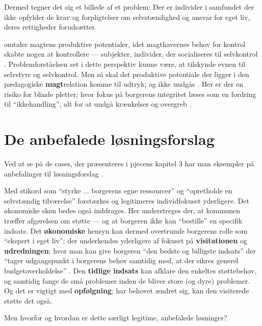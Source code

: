 Dermed tegner det sig et billede af et problem: Der er individer i samfundet der ikke opfylder de krav og forpligtelser om selvstændighed og ansvar for eget liv, deres rettigheder forudsætter.

\citeauthor{foucaultOvervagningOgStraf2005} omtaler magtens produktive potentialer, idet magthavernes behov for kontrol skabte nogen at kontrollere --- subjekter, individer, der socialiseres til selvkontrol \autocite{foucaultOvervagningOgStraf2005}.
Problemforståelsen set i dette perspektiv kunne være, at tilskynde evnen til selvstyre og selvkontrol.
Men så skal det produktive potentiale der ligger i den pædagogiske \textbf{magt}relation komme til udtryk; og ikke undgås \autocite{hurFrigorelsensMagt2015}.
Her er der en risiko for blinde pletter; hvor fokus på borgerens integritet læses som en fordring til “ikkehandling”, alt for at undgå krænkelser og overgreb \autocite{langagerDetAfmalteLiv2013}.

\section{De anbefalede løsningsforslag}
Ved at se på de cases, der præsenteres i pjecens kapitel 3 har man eksempler på anbefalinger til løsningsforslag \autocite[ss. 18-40]{klStyringAfDet2017}.

Med stikord som “styrke ... borgerens egne ressourcer” og “opretholde en selvstændig tilværelse” forstærkes og legitimeres individfokuset yderligere.
Det økonomiske skøn bedes også inddrages. Her understreges der, at kommunen træffer afgørelsen om støtte — og at borgeren ikke kan “bestille” en specifik indsats.
Det \textbf{økonomiske} hensyn kan dermed overtrumfe borgerens rolle som “ekspert i eget liv”; der underkendes yderligere af fokuset på \textbf{visitationen} og \textbf{udredningen}; hvor man kan give borgeren “den bedste og billigste indsats” der “tager udgangspunkt i borgerens behov samtidig med, at der sikres generel budgetoverholdelse” .
Den \textbf{tidlige indsats} kan afklare den enkeltes støttebehov, og samtidig fange de små problemer inden de bliver store (og dyre) problemer.
Og det er vigtigt med \textbf{opfølgning}; har behovet ændret sig, kan den visiterede støtte det også.

Men hvorfor og hvordan er dette særligt legitime, anbefalede løsninger? 

